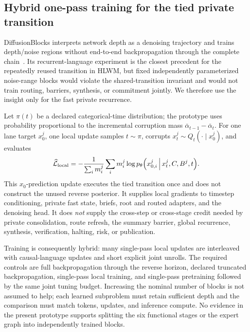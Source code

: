 \documentclass[10pt,a4paper]{article}
\newcommand{\Lcal}{\mathcal{L}}
\begin{document}
\subsection{Hybrid one-pass training for the tied private transition}
\label{sec:hybrid}

DiffusionBlocks interprets network depth as a denoising trajectory and trains
depth/noise regions without end-to-end backpropagation through the complete
chain~\cite{shing2025}. Its recurrent-language experiment is the closest
precedent for the repeatedly reused transition in HLWM, but fixed independently
parameterized noise-range blocks would violate the shared-transition invariant
and would not train routing, barriers, synthesis, or commitment jointly. We
therefore use the insight only for the fast private recurrence.

Let $\pi(t)$ be a declared categorical-time distribution; the prototype uses
probability proportional to the incremental corruption mass
$\bar{\alpha}_{t-1} - \bar{\alpha}_t$. For one lane target $x^j_0$, one local
update samples $t \sim \pi$, corrupts $x^j_t \sim Q_t(\cdot \mid x^j_0)$, and
evaluates
\begin{equation}
\widehat{\Lcal}_{\mathrm{local}} = - \frac{1}{\sum_i m^j_i}
\sum_i m^j_i \log p_\theta\Bigl( x^j_{0,i} \,\Big|\, x^j_t, C, B^j, t \Bigr).
\end{equation}
This $x_0$-prediction update executes the tied transition once and does not
construct the unused reverse posterior. It supplies local gradients to
timestep conditioning, private fast state, briefs, root and routed adapters,
and the denoising head. It does \emph{not} supply the cross-step or
cross-stage credit needed by private consolidation, route refresh, the summary
barrier, global recurrence, synthesis, verification, halting, risk, or
publication.

Training is consequently hybrid: many single-pass local updates are interleaved
with causal-language updates and short explicit joint unrolls. The required
controls are full backpropagation through the reverse horizon, declared
truncated backpropagation, single-pass local training, and single-pass
pretraining followed by the same joint tuning budget. Increasing the nominal
number of blocks is not assumed to help; each learned subproblem must retain
sufficient depth and the comparison must match tokens, updates, and inference
compute. No evidence in the present prototype supports splitting the six
functional stages or the expert graph into independently trained blocks.
\end{document}
